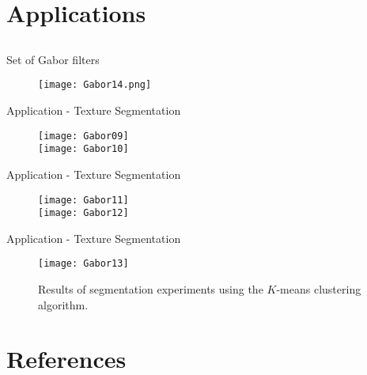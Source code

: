 \section{Applications}
\subsection{}
\begin{frame}{Set of Gabor filters}
\begin{figure}
\texttt{[image: Gabor14.png]}
\end{figure}
\end{frame}

\begin{frame}{Application - Texture Segmentation}
\begin{figure}
\texttt{[image: Gabor09]}\\
\texttt{[image: Gabor10]}
\end{figure}
\end{frame}

\begin{frame}{Application - Texture Segmentation}
\begin{figure}
\texttt{[image: Gabor11]}\\
\texttt{[image: Gabor12]}
\end{figure}
\end{frame}

\begin{frame}{Application - Texture Segmentation}
\begin{figure}
\texttt{[image: Gabor13]}
\caption{Results of segmentation experiments using the $K$-means clustering algorithm.}
\end{figure}
\end{frame}

\section{References}
